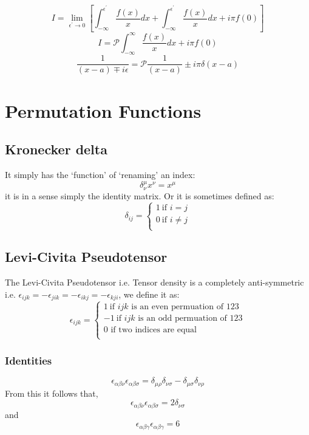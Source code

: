 $$	I = \lim_{\epsilon^{'} \rightarrow 0} \left[ \int_{- \infty}^{\epsilon^{'}} \frac{f(x)}{x} dx + \int_{- \infty}^{\epsilon^{'}} \frac{f(x)}{x} dx + i \pi f(0)\right]$$
\begin{equation}
I =   \mathscr{P}\int_{- \infty}^{\infty} \frac{f(x)}{x} dx + i \pi f(0)
\end{equation}
\begin{equation}
\frac{1}{(x-a)\mp i \epsilon} = \mathscr{P}\frac{1}{(x-a)}\pm i \pi \delta(x-a)
\end{equation}
\section{Permutation Functions}
\subsection{Kronecker delta}
It simply has the ‘function’ of ‘renaming’ an index:
$$\delta^{\mu}_{\nu} x^{\nu} = x^{\mu}$$
it is in a sense simply the identity matrix. Or it is sometimes defined as:
\begin{equation}
\delta_{ij} = \begin{cases}
1 \ \text{if } i = j \\
0 \ \text{if } i \neq j\\
\end{cases}
\end{equation}
\subsection{Levi-Civita Pseudotensor}
\label{Levi}
The Levi-Civita Pseudotensor i.e. Tensor density is a completely anti-symmetric i.e. $\epsilon_{ijk} = -\epsilon_{jik} = -\epsilon_{ikj} = -\epsilon_{kji}$, we define it as:
\begin{equation}
\epsilon_{ijk} = \begin{cases}
1 \ \text{if } ijk \text{ is an even permuation of } 123\\
-1 \ \text{if } ijk \text{ is an odd permuation of } 123\\
0  \text{ if two indices are equal}\\
\end{cases}
\end{equation}
\subsubsection{Identities}
\begin{equation}
\epsilon_{\alpha \beta \nu}\epsilon_{\alpha \beta \sigma} = \delta_{\mu \rho} \delta_{\nu \sigma} - \delta_{\mu \sigma}\delta_{\nu \rho} 
\end{equation}
From this it follows that,
\begin{equation}
\epsilon_{\alpha \beta \nu}\epsilon_{\alpha \beta \sigma} = 2\delta_{\nu \sigma}
\end{equation}
and
\begin{equation}
\epsilon_{\alpha \beta \gamma}\epsilon_{\alpha \beta \gamma} = 6
\end{equation}
